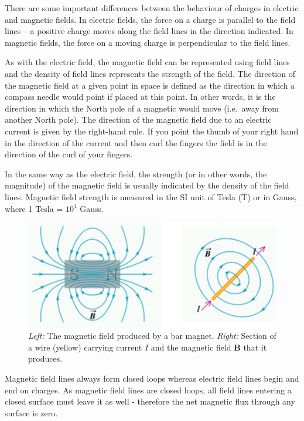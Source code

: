 \documentclass[
  letterpaper,
  DIV=11,
  numbers=noendperiod]{scrreprt}
\begin{document}
There are some important differences between the behaviour of charges in
electric and magnetic fields. In electric fields, the force on a charge
is parallel to the field lines -- a positive charge moves along the
field lines in the direction indicated. In magnetic fields, the force on
a moving charge is perpendicular to the field lines.

As with the electric field, the magnetic field can be represented using
field lines and the density of field lines represents the strength of
the field. The direction of the magnetic field at a given point in space
is defined as the direction in which a compass needle would point if
placed at this point. In other words, it is the direction in which the
North pole of a magnetic would move (i.e.~away from another North pole).
The direction of the magnetic field due to an electric current is given
by the right-hand rule. If you point the thumb of your right hand in the
direction of the current and then curl the fingers the field is in the
direction of the curl of your fingers.

In the same way as the electric field, the strength (or in other words,
the magnitude) of the magnetic field is usually indicated by the density
of the field lines. Magnetic field strength is measured in the SI unit
of Tesla (T) or in Gauss, where 1 Tesla = \(10^4\) Gauss.

\begin{figure}[H]

{\centering \includegraphics[width=5.20833in,height=\textheight]{Figures/MagFields.png}

}

\caption{\emph{Left:} The magnetic field produced by a bar magnet.
\emph{Right:} Section of a wire (yellow) carrying current \(I\) and the
magnetic field \(\mathrm{\mathbf{B}}\) that it produces.}

\end{figure}%

Magnetic field lines always form closed loops whereas electric field
lines begin and end on charges. As magnetic field lines are closed
loops, all field lines entering a closed surface must leave it as well -
therefore the net magnetic flux through any surface is zero.
\end{document}
